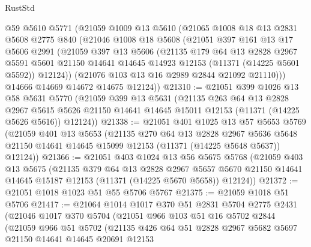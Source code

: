 \begin{lexlean}{RustStd}
\begin{coremodule}
    @59
    @5610
    @5771
    (@21059
      @1009
      @13
      @5610
      (@21065
        @1008
        @18
        @13
        @2831
        @5608
        @2775
        @840
        (@21046
          @1008
          @18
          @5608
          (@21051
            @397
            @161
            @13
            @17
            @5606
            @2991
            (@21059
              @397
              @13
              @5606
              (@21135
                @179
                @64
                @13
                @2828
                @2967
                @5591
                @5601
                @21150
                @14641
                @14645
                @14923
                @12153
                (@11371 (@14225 @5601 @5592))
                @12124))
            (@21076 @103 @13 @16 @2989 @2844 @21092 @21110)))
        @14666
        @14669
        @14672
        @14675
        @12124))
@21310 := @21051
    @399
    @1026
    @13
    @58
    @5631
    @5770
    (@21059
      @399
      @13
      @5631
      (@21135
        @263
        @64
        @13
        @2828
        @2967
        @5615
        @5626
        @21150
        @14641
        @14645
        @15011
        @12153
        (@11371 (@14225 @5626 @5616))
        @12124))
@21338 := @21051
    @401
    @1025
    @13
    @57
    @5653
    @5769
    (@21059
      @401
      @13
      @5653
      (@21135
        @270
        @64
        @13
        @2828
        @2967
        @5636
        @5648
        @21150
        @14641
        @14645
        @15099
        @12153
        (@11371 (@14225 @5648 @5637))
        @12124))
@21366 := @21051
    @403
    @1024
    @13
    @56
    @5675
    @5768
    (@21059
      @403
      @13
      @5675
      (@21135
        @379
        @64
        @13
        @2828
        @2967
        @5657
        @5670
        @21150
        @14641
        @14645
        @15187
        @12153
        (@11371 (@14225 @5670 @5658))
        @12124))
@21372 := @21051 @1018 @1023 @51 @55 @5706 @5767
@21375 := @21059 @1018 @51 @5706
@21417 := @21064
    @1014
    @1017
    @370
    @51
    @2831
    @5704
    @2775
    @2431
    (@21046
      @1017
      @370
      @5704
      (@21051
        @966
        @103
        @51
        @16
        @5702
        @2844
        (@21059
          @966
          @51
          @5702
          (@21135
            @426
            @64
            @51
            @2828
            @2967
            @5682
            @5697
            @21150
            @14641
            @14645
            @20691
            @12153

\end{coremodule}
\end{lexlean}
